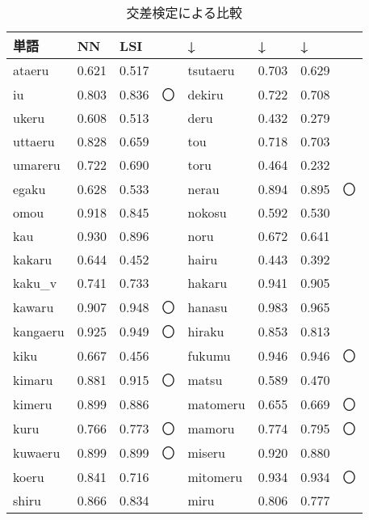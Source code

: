 \begin{table}[htbp]
  \begin{center}
    \leavevmode
    \caption{交差検定による比較}
    \begin{tabular}{|p{}|p{}|p{}p{}||p{}|p{}|p{}p{}|} \hline
    単語 & NN &  LSI &    & ↓ & ↓  & ↓  & \\ \hline
ataeru     &  0.621  & 0.517 &      &      tsutaeru   &  0.703  & 0.629 &       \\
iu         &  0.803  & 0.836 & 〇   &      dekiru     &  0.722  & 0.708 &       \\
ukeru      &  0.608  & 0.513 &      &      deru       &  0.432  & 0.279 &       \\
uttaeru    &  0.828  & 0.659 &      &      tou        &  0.718  & 0.703 &       \\
umareru    &  0.722  & 0.690 &      &      toru       &  0.464  & 0.232 &       \\
egaku      &  0.628  & 0.533 &      &      nerau      &  0.894  & 0.895 & 〇    \\
omou       &  0.918  & 0.845 &      &      nokosu     &  0.592  & 0.530 &       \\
kau        &  0.930  & 0.896 &      &      noru       &  0.672  & 0.641 &       \\
kakaru     &  0.644  & 0.452 &      &      hairu      &  0.443  & 0.392 &       \\
kaku\_v    &  0.741  & 0.733 &      &      hakaru     &  0.941  & 0.905 &       \\
kawaru     &  0.907  & 0.948 & 〇   &      hanasu     &  0.983  & 0.965 &       \\
kangaeru   &  0.925  & 0.949 & 〇   &      hiraku     &  0.853  & 0.813 &       \\
kiku       &  0.667  & 0.456 &      &      fukumu     &  0.946  & 0.946 & 〇     \\
kimaru     &  0.881  & 0.915 & 〇   &      matsu      &  0.589  & 0.470 &       \\
kimeru     &  0.899  & 0.886 &      &      matomeru   &  0.655  & 0.669 & 〇    \\
kuru       &  0.766  & 0.773 & 〇   &      mamoru     &  0.774  & 0.795 & 〇    \\
kuwaeru    &  0.899  & 0.899 & 〇   &      miseru     &  0.920  & 0.880 &       \\
koeru      &  0.841  & 0.716 &      &      mitomeru   &  0.934  & 0.934 & 〇    \\
shiru      &  0.866  & 0.834 &      &      miru       &  0.806  & 0.777 &       \\

\end{tabular}
\end{center}
\end{table}
